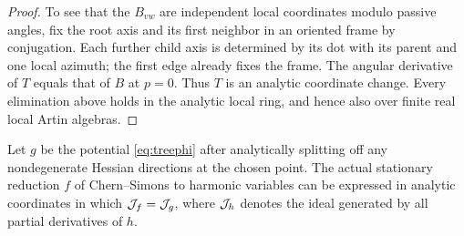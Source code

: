 \begin{proof}
To see that the \(B_{vw}\) are independent local coordinates modulo passive angles, fix the root axis and its first neighbor in an oriented frame by conjugation. Each further child axis is determined by its dot with its parent and one local azimuth; the first edge already fixes the frame. The angular derivative of \(T\) equals that of \(B\) at \(p=0\). Thus \(T\) is an analytic coordinate change. Every elimination above holds in the analytic local ring, and hence also over finite real local Artin algebras.
\end{proof}

\begin{lemma}\label{lem:coulomb}
Let \(g\) be the potential \eqref{eq:treephi} after analytically splitting off any nondegenerate Hessian directions at the chosen point. The actual stationary reduction \(f\) of Chern--Simons to harmonic variables can be expressed in analytic coordinates in which \(\mathcal J_f=\mathcal J_g\), where \(\mathcal J_h\) denotes the ideal generated by all partial derivatives of \(h\).
\end{lemma}
